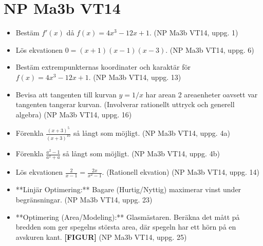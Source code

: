 \documentclass{article}
\begin{document}
\section*{NP Ma3b VT14}
\begin{itemize}
    \item Bestäm $f'(x)$ då $f(x) = 4x^3 - 12x + 1$. (NP Ma3b VT14, uppg. 1)
    \item Lös ekvationen $0 = (x+1)(x-1)(x-3)$. (NP Ma3b VT14, uppg. 6)
    \item Bestäm extrempunkternas koordinater och karaktär för $f(x) = 4x^3 - 12x + 1$. (NP Ma3b VT14, uppg. 13)
    \item Bevisa att tangenten till kurvan $y=1/x$ har arean 2 areaenheter oavsett var tangenten tangerar kurvan. (Involverar rationellt uttryck och generell algebra) (NP Ma3b VT14, uppg. 16)
    \item Förenkla $\frac{(x+3)^5}{(x+3)^{10}}$ så långt som möjligt. (NP Ma3b VT14, uppg. 4a)
    \item Förenkla $\frac{a^2-1}{a^2+a}$ så långt som möjligt. (NP Ma3b VT14, uppg. 4b)
    \item Lös ekvationen $\frac{2}{x-1} = \frac{2x}{x^2-1}$. (Rationell ekvation) (NP Ma3b VT14, uppg. 14)
    \item **Linjär Optimering:** Bagare (Hurtig/Nyttig) maximerar vinst under begränsningar. (NP Ma3b VT14, uppg. 23)
    \item **Optimering (Area/Modeling):** Glasmästaren. Beräkna det mått på bredden som ger spegelns största area, där spegeln har ett hörn på en avskuren kant. \textbf{[FIGUR]} (NP Ma3b VT14, uppg. 25)
\end{itemize}
\end{document}
